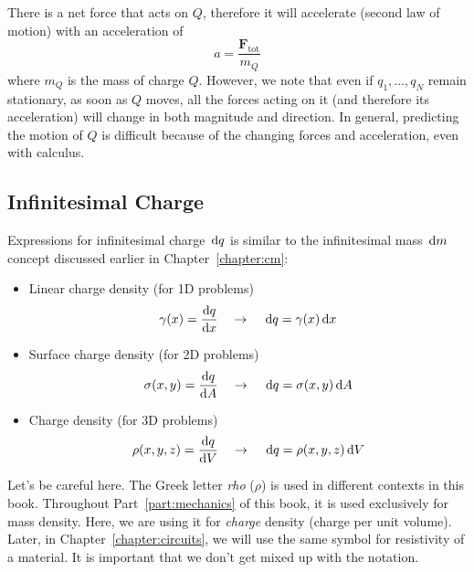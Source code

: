 There is a net force that acts on $Q$, therefore it will accelerate (second
law of motion) with an acceleration of
\begin{equation*}
  a=\frac{\bm F_\text{tot}}{m_Q}
\end{equation*}
where $m_Q$ is the mass of charge $Q$. However, we note that even if
$q_1,\ldots,q_N$ remain stationary, as soon as $Q$ moves, all the forces acting
on it (and therefore its acceleration) will change in both magnitude and
direction. In general, predicting the motion of $Q$ is difficult because of the
changing forces and acceleration, even with calculus.


\subsection{Infinitesimal Charge}
\label{section:charge-density}

Expressions for infinitesimal charge $\dl q$ is similar to the infinitesimal
mass $\dl m$ concept discussed earlier in Chapter~\ref{chapter:cm}:
\begin{itemize}
\item Linear charge density (for 1D problems)
  \begin{equation}
    \gamma(x) = \diff qx\quad\rightarrow\quad \dl q =\gamma(x)\dl x
  \end{equation}
  \item Surface charge density (for 2D problems)
    \begin{equation}
      \sigma(x,y)=\diff qA\quad\rightarrow\quad \dl q=\sigma(x,y)\dl A
    \end{equation}
  \item Charge density (for 3D problems)
    \begin{equation}
      \rho(x,y,z)=\diff qV\quad\rightarrow\quad \dl q=\rho(x,y,z)\dl V
    \end{equation}
\end{itemize}

\begin{remark}
  Let's be careful here. The Greek letter \emph{rho} ($\rho$) is used in
  different contexts in this book. Throughout Part~\ref{part:mechanics} of
  this book, it is used exclusively for mass density.
  Here, we are using it for \emph{charge} density (charge per unit volume).
  Later, in Chapter~\ref{chapter:circuits}, we will use the same symbol for
  resistivity of a material. It is important that we don't get mixed up with
  the notation.
\end{remark}

